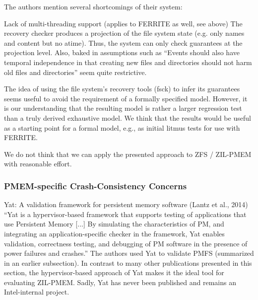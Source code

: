\documentclass[12pt,a4paper,twoside,draft]{book}
\begin{document}
The authors mention several shortcomings of their system:

    Lack of multi-threading support (applies to FERRITE as well, see above)
    The recovery checker produces a projection of the file system state (e.g. only names and content but no atime). Thus, the system can only check guarantees at the projection level.
    Also, baked in assumptions such as “Events should also have temporal independence in that creating new files and directories should not harm old files and directories” seem quite restrictive.

The idea of using the file system’s recovery tools (fsck) to infer its guarantees seems useful to avoid the requirement of a formally specified model. However, it is our understanding that the resulting model is rather a larger regression test than a truly derived exhaustive model.
We think that the results would be useful as a starting point for a formal model, e.g., as initial litmus tests for use with FERRITE.

We do not think that we can apply the presented approach to ZFS / ZIL-PMEM with reasonable effort.

\subsubsection{PMEM-specific Crash-Consistency Concerns}

Yat: A validation framework for persistent memory software (Lantz et al., 2014) “Yat is a hypervisor-based framework that supports testing of applications that use Persistent Memory [...] By simulating the characteristics of PM, and integrating an application-specific checker in the framework, Yat enables validation, correctness testing, and debugging of PM software in the presence of power failures and crashes.”
The authors used Yat to validate PMFS (summarized in an earlier subsection).
In contrast to many other publications presented in this section, the hypervisor-based approach of Yat makes it the ideal tool for evaluating ZIL-PMEM.
Sadly, Yat has never been published and remains an Intel-internal project.
\end{document}
